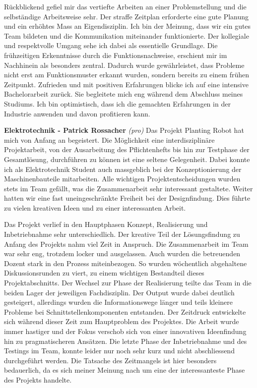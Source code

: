 Rückblickend gefiel mir das vertiefte Arbeiten an einer Problemstellung und die selbständige Arbeitsweise sehr. Der straffe Zeitplan erforderte eine gute Planung und ein erhöhtes Mass an Eigendisziplin. Ich bin der Meinung, dass wir ein gutes Team bildeten und die Kommunikation miteinander funktionierte. Der kollegiale und respektvolle Umgang sehe ich dabei als essentielle Grundlage. Die frühzeitigen Erkenntnisse durch die Funktionsnachweise, erschient mir im Nachhinein als besonders zentral. Dadurch wurde gewährleistet, dass Probleme nicht erst am Funktionsmuster erkannt wurden, sondern bereits zu einem frühen Zeitpunkt.
\newline
Zufrieden und mit positiven Erfahrungen blicke ich auf eine intensive Bachelorarbeit zurück. Sie begleitete mich eng während dem Abschluss meines Studiums. Ich bin optimistisch, dass ich die gemachten Erfahrungen in der Industrie anwenden und davon profitieren kann.
\newline

\textbf{Elektrotechnik - Patrick Rossacher}
\newline
\textit{(pro)} Das Projekt Planting Robot hat mich von Anfang an begeistert. Die Möglichkeit eine interdisziplinäre Projektarbeit, von der Ausarbeitung des Pflichtenhefts bis hin zur Testphase der Gesamtlösung, durchführen zu können ist eine seltene Gelegenheit. Dabei konnte ich als Elektrotechnik Student auch massgeblich bei der Konzeptionierung der Maschinenbauteile mitarbeiten. Alle wichtigen Projektentscheidungen wurden stets im Team gefällt, was die Zusammenarbeit sehr interessant gestaltete. Weiter hatten wir eine fast uneingeschränkte Freiheit bei der Designfindung. Dies führte zu vielen kreativen Ideen und zu einer interessanten Arbeit.
\newline
	
Das Projekt verlief in den Hauptphasen Konzept, Realisierung und Inbetriebnahme sehr unterschiedlich. Der kreative Teil der Lösungsfindung zu Anfang des Projekts nahm viel Zeit in Anspruch. Die Zusammenarbeit im Team war sehr eng, trotzdem locker und ausgelassen. Auch wurden die betreuenden Dozent stark in den Prozess miteinbezogen. So wurden wöchentlich abgehaltene Diskussionsrunden zu viert, zu einem wichtigen Bestandteil dieses Projektabschnitts. Der Wechsel zur Phase der Realisierung teilte das Team in die beiden Lager der jeweiligen Fachdisziplin. Der Output wurde dabei deutlich gesteigert, allerdings wurden die Informationswege länger und teils kleinere Probleme bei Schnittstellenkomponenten entstanden. Der Zeitdruck entwickelte sich während dieser Zeit zum Hauptproblem des Projektes. Die Arbeit wurde immer hastiger und der Fokus verschob sich von einer innovativen Ideenfindung hin zu pragmatischeren Ansätzen. Die letzte Phase der Inbetriebnahme und des Testings im Team, konnte leider nur noch sehr kurz und nicht abschliessend durchgeführt werden. Die Tatsache des Zeitmangels ist hier besonders bedauerlich, da es sich meiner Meinung nach um eine der interessanteste Phase des Projekts handelte.
\newline

